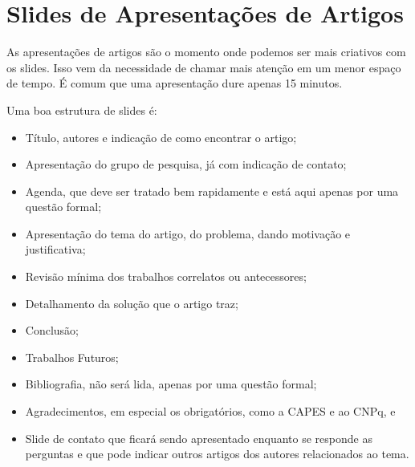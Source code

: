 \section{Slides de Apresentações de Artigos}

As apresentações de artigos são o momento onde podemos ser mais criativos com os slides. Isso vem da necessidade de chamar mais atenção em um menor espaço de tempo. É comum que uma apresentação dure apenas 15 minutos.


Uma boa estrutura de slides é:
\begin{itemize}
    \item Título, autores e indicação de como encontrar o artigo;
    \item Apresentação do grupo de pesquisa, já com indicação de contato;
    \item Agenda, que deve ser tratado bem rapidamente e está aqui apenas por uma questão formal;
    \item Apresentação do tema do artigo, do problema, dando motivação e justificativa;
    \item Revisão mínima dos trabalhos correlatos ou antecessores;
    \item Detalhamento da solução que o artigo traz;
    \item Conclusão;
    \item Trabalhos Futuros;
    \item Bibliografia, não será lida, apenas por uma questão formal;
    \item Agradecimentos, em especial os obrigatórios, como a CAPES e ao CNPq, e
    \item Slide de contato que ficará sendo apresentado enquanto se responde as perguntas e que pode indicar outros artigos dos autores relacionados ao tema.
\end{itemize}

